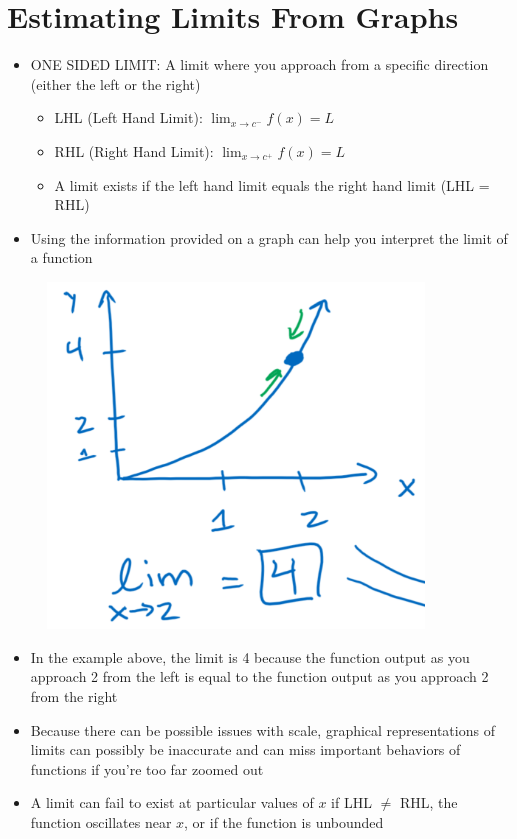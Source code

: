 \documentclass{package/notes}
\begin{document}
\section{Estimating Limits From Graphs}

\begin{itemize}
	\item ONE SIDED LIMIT: A limit where you approach from a specific direction (either the left or the right)
	\begin{itemize}
		\item LHL (Left Hand Limit): $\lim_{x\to c^-} f(x) = L$
		\item RHL (Right Hand Limit): $\lim_{x\to c^+} f(x) = L$
		\item A limit exists if the left hand limit equals the right hand limit (LHL = RHL)
	\end{itemize}
	\item Using the information provided on a graph can help you interpret the limit of a function
\end{itemize}

\begin{figure}[h]
	\begin{center}
		\includegraphics[width = 10cm]{images/1.2_Image.PNG}
	\end{center}
\end{figure}

\begin{itemize}
	\item In the example above, the limit is 4 because the function output as you approach 2 from the left is equal to the function output as you approach 2 from the right
	\item Because there can be possible issues with scale, graphical representations of limits can possibly be inaccurate and can miss important behaviors of functions if you're too far zoomed out
	\item A limit can fail to exist at particular values of $x$ if LHL $\ne$ RHL, the function oscillates near $x$, or if the function is unbounded
\end{itemize}
\newpage
\end{document}
